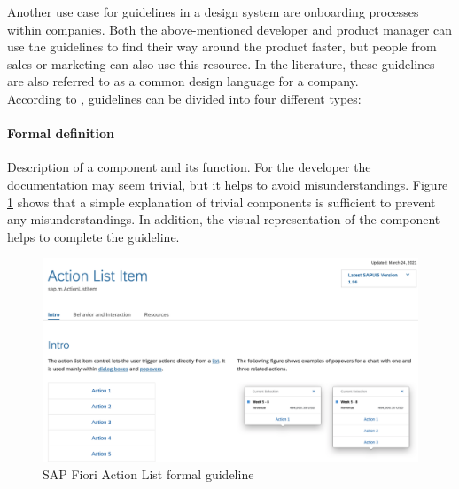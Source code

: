 Another use case for guidelines in a design system are onboarding processes within companies. Both the above-mentioned developer and product manager can use the guidelines to find their way around the product faster, but people from sales or marketing can also use this resource.  In the literature, these guidelines are also referred to as a common design language for a company.  \\
According to \citet*{vesselov_building_2019}, guidelines can be divided into four different types: 


\paragraph*{Formal definition} 
Description of a component and its function. For the developer the documentation may seem trivial, but it helps to avoid misunderstandings. \cite{vesselov_building_2019} Figure \ref{fiori_action_list} shows that a simple explanation of trivial components is sufficient to prevent any misunderstandings. In addition, the visual representation of the component helps to complete the guideline.
\begin{figure}[ht]
\centerline{\includegraphics[width=\linewidth]{images/fiori_action-list_formal.png}}
\caption{SAP Fiori Action List formal guideline \cite{sap_fiori_action_nodate}}
\label{fiori_action_list}
\end{figure}
\newpage
